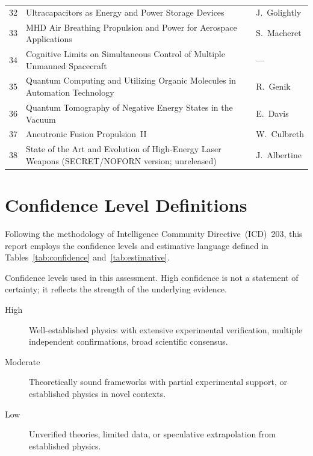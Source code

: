 \documentclass[aps,prd,twocolumn,superscriptaddress,nofootinbib,floatfix]{revtex4-2}
\begin{document}
\begin{table}[htbp]
\begin{tabular}{@{}rll@{}}
32 & \parbox[t]{0.68\textwidth}{\strut Ultracapacitors as Energy and Power Storage Devices\strut} & J.\ Golightly \\
33 & \parbox[t]{0.68\textwidth}{\strut MHD Air Breathing Propulsion and Power for Aerospace Applications\strut} &
  S.\ Macheret \\
34 & \parbox[t]{0.68\textwidth}{\strut Cognitive Limits on Simultaneous Control of Multiple Unmanned Spacecraft\strut} &
  --- \\
35 & \parbox[t]{0.68\textwidth}{\strut Quantum Computing and Utilizing Organic Molecules in Automation Technology\strut} &
  R.\ Genik \\
36 & \parbox[t]{0.68\textwidth}{\strut Quantum Tomography of Negative Energy States in the Vacuum\strut} & E.\ Davis \\
37 & \parbox[t]{0.68\textwidth}{\strut Aneutronic Fusion Propulsion~II\strut} & W.\ Culbreth \\
38 & \parbox[t]{0.68\textwidth}{\strut State of the Art and Evolution of High-Energy Laser Weapons (SECRET/NOFORN
  version; unreleased)\strut} & J.\ Albertine \\
\bottomrule
\end{tabular}
\end{table}

\section{Confidence Level Definitions}\label{app:confidence}

Following the methodology of Intelligence Community Directive~(ICD)~203, this
report employs the confidence levels and estimative language defined in
Tables~\ref{tab:confidence} and~\ref{tab:estimative}.

\begin{table}[tb]
\caption{Confidence levels used in this assessment. High confidence is not a
statement of certainty; it reflects the strength of the underlying evidence.}
\label{tab:confidence}
\begin{description}
\item[High] Well-established physics with extensive experimental verification,
  multiple independent confirmations, broad scientific consensus.
  \item[Moderate] Theoretically sound frameworks with partial experimental support, or
    established physics in novel contexts.
    \item[Low] Unverified theories, limited data, or speculative extrapolation from
      established physics.
      \end{description}
\end{table}
\end{document}
